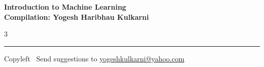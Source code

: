 \documentclass[8pt,landscape]{article}
\begin{document}
\footnotesize


\begin{center}
\Large{\textbf{Introduction to Machine Learning\\ Compilation: Yogesh Haribhau Kulkarni}}
\end{center}

\begin{multicols}{3}

\end{multicols}

\rule{\linewidth}{0.25pt}
\scriptsize
Copyleft \textcopyleft\  Send suggestions to
\href{http://www.yogeshkulkarni.com}{yogeshkulkarni@yahoo.com}
\end{document}
